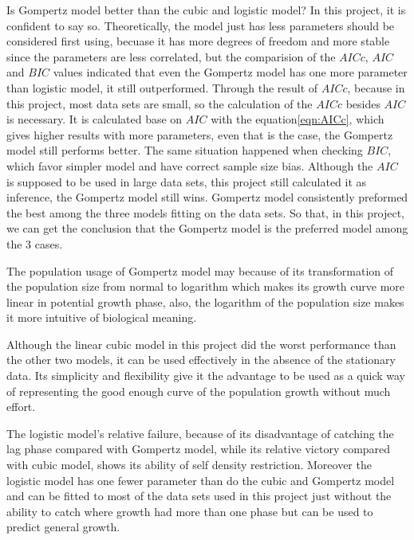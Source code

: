 \documentclass[11pt, a4paper]{article}
\begin{document}
Is Gompertz model better than the cubic and logistic model? In this project, it is confident to say so. Theoretically, the model just has less parameters should be considered first using, becuase it has more degrees of freedom and more stable since the parameters are less correlated, but the comparision of the $AICc$, $AIC$ and $BIC$ values indicated that even the Gompertz model has one more parameter than logistic model, it still outperformed. Through the result of $AICc$, because in this project, most data sets are small, so the calculation of the $AICc$ besides $AIC$ is necessary. It is calculated base on $AIC$ with the equation\ref{eqn:AICc}, which gives higher results with more parameters, even that is the case, the Gompertz model still performs better. The same situation happened when checking $BIC$, which favor simpler model and have correct sample size bias. Although the $AIC$ is supposed to be used in large data sets, this project still calculated it as inference, the Gompertz model still wins. Gompertz model consistently preformed the best among the three models fitting on the data sets. So that, in this project, we can get the conclusion that the Gompertz model is the preferred model among the 3 cases.

The population usage of Gompertz model may because of its transformation of the population size from normal to logarithm which makes its growth curve more linear in potential growth phase\citep{buchanan1997simple}, also, the logarithm of the population size makes it more intuitive of biological meaning.

Although the linear cubic model in this project did the worst performance than the other two models, it can be used effectively in the absence of the stationary data\citep{buchanan1997simple}. Its simplicity and flexibility give it the advantage to be used as a quick way of representing the good enough curve of the population growth without much effort. 

The logistic model's relative failure, because of its disadvantage of catching the lag phase compared with Gompertz model, while its relative victory compared with cubic model, shows its ability of self density restriction\citep{eberhardt2008analyzing}. Moreover the logistic model has one fewer parameter than do the cubic and Gompertz model and can be fitted to most of the data sets used in this project just without the ability to catch where growth had more than one phase but can be used to predict general growth\citep{balmer2012evolution}. 
\end{document}
